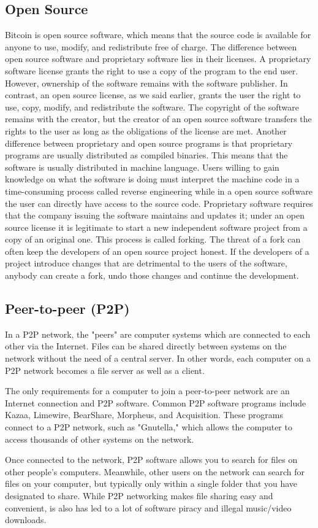\documentclass{article}
\begin{document}
\subsection*{Open Source}
Bitcoin is open source software, which means that the source code is available for anyone to use, modify, and redistribute free of charge. The difference between open source software and proprietary software lies in their licenses. A proprietary software license grants the right to use a copy of the program to the end user. However, ownership of the software remains with the software publisher. In contrast, an open source license, as we said earlier,  grants the user the right to use, copy, modify, and redistribute the software. The copyright of the software remains with the creator, but the creator of an open source software transfers the rights to the user as long as the obligations of the license are met. Another difference between proprietary and open source programs is that proprietary programs are usually distributed as compiled binaries. This means that the software is usually distributed in machine language. Users willing to gain knowledge on what the software is doing must interpret the machine code in a time-consuming process called reverse engineering while in a open source software the user can directly have access to the source code.\newline
Proprietary software requires that the company issuing the software maintains and updates it; under an open source license it is legitimate to start a new independent software project from a copy of an original one. This process is called forking. The threat of a fork can often keep the developers of an open source project honest. If the developers of a project introduce changes that are detrimental to the users of the software, anybody can create a fork, undo those changes and continue the development.
\subsection*{Peer-to-peer (P2P)}
In a P2P network, the "peers" are computer systems which are connected to each other via the Internet. Files can be shared directly between systems on the network without the need of a central server. In other words, each computer on a P2P network becomes a file server as well as a client.\par
\noindent The only requirements for a computer to join a peer-to-peer network are an Internet connection and P2P software. Common P2P software programs include Kazaa, Limewire, BearShare, Morpheus, and Acquisition. These programs connect to a P2P network, such as "Gnutella," which allows the computer to access thousands of other systems on the network.\par
\noindent Once connected to the network, P2P software allows you to search for files on other people’s computers. Meanwhile, other users on the network can search for files on your computer, but typically only within a single folder that you have designated to share. While P2P networking makes file sharing easy and convenient, is also has led to a lot of software piracy and illegal music/video downloads.
\end{document}
